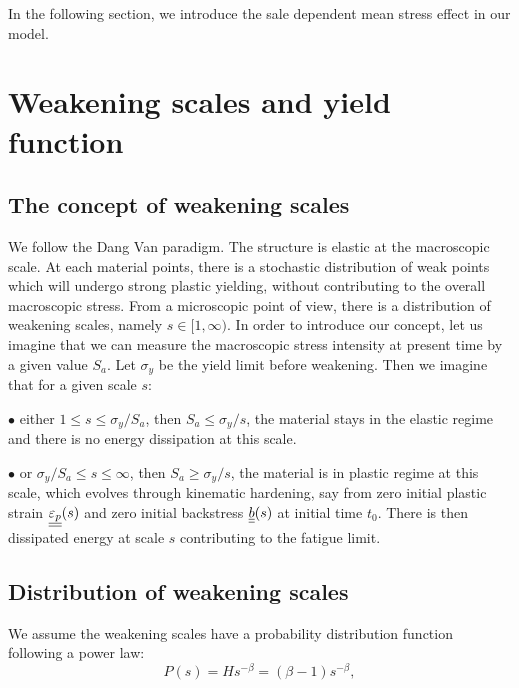 In the following section, we introduce the sale dependent mean stress effect in our model.

\section{Weakening scales and yield function}
\label{sec:5.4}
\subsection{The concept of weakening scales} 

We follow the Dang Van paradigm. The structure is elastic at the macroscopic scale. At each material points, there is a stochastic distribution of weak points which will undergo strong plastic yielding, without contributing to the overall macroscopic stress. From a microscopic point of view, there is a distribution of weakening scales, namely $s\in[1,\infty)$. In order to introduce our concept, let us imagine that we can measure the macroscopic stress intensity at present time by a given value $S_{a}$. Let $\sigma_y$ be the yield limit before weakening. Then we imagine that for a given scale $s$:

\vspace{6pt}
\noindent
$\bullet$ either $1\leqslant s\leqslant \sigma_y/S_{a}$, then $S_{a}\leqslant \sigma_y/s$, the material stays in the elastic regime and there is no energy dissipation at this scale.

\vspace{6pt}
\noindent
$\bullet$ or $\sigma_y/S_{a}\leqslant s\leqslant \infty$, then $S_{a}\geqslant \sigma_y/s$, the material is in plastic regime at this scale, which evolves through kinematic hardening, say from zero initial plastic strain $\uline{\uline{\varepsilon_p}}(s)$ and zero initial backstress $\uline{\uline{b}}(s)$ at initial time $t_0$. There is then dissipated energy at scale $s$ contributing to the fatigue limit.


\vspace{6pt}

\subsection{Distribution of weakening scales}

We assume the weakening scales have a  probability distribution function following a power law:
\begin{equation}
P(s) = Hs^{-\beta}=(\beta-1)s^{-\beta},
\label{eq.ps}
\end{equation}

